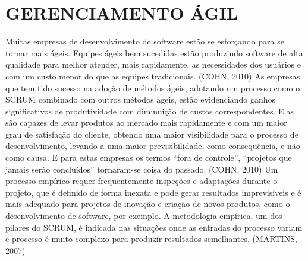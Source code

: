 \section{GERENCIAMENTO ÁGIL}
Muitas empresas de desenvolvimento de software estão se esforçando para se tornar mais ágeis. Equipes ágeis bem sucedidas estão produzindo software de alta qualidade para melhor atender, mais rapidamente, as necessidades dos usuários e com um custo menor do que as equipes tradicionais. (COHN, 2010)
As empresas que tem tido sucesso na adoção de métodos ágeis, adotando um processo como o SCRUM combinado com outros métodos ágeis, estão evidenciando ganhos significativos de produtividade com diminuição de custos correspondentes. Elas são capazes de levar produtos ao mercado mais rapidamente e com um maior grau de satisfação do cliente, obtendo uma maior visibilidade para o processo de desenvolvimento, levando a uma maior previsibilidade, como consequência, e não como causa. E para estas empresas os termos “fora de controle”, “projetos que jamais serão concluídos” tornaram-se coisa do passado. (COHN, 2010)
Um processo empírico requer frequentemente inspeções e adaptações durante o projeto, que é definido de forma inexata e pode gerar resultados imprevisíveis e é mais adequado para projetos de inovação e criação de novos produtos, como o desenvolvimento de software, por exemplo. A metodologia empírica, um dos pilares do SCRUM, é indicada nas situações onde as entradas do processo variam e processo é muito complexo para produzir resultados semelhantes. (MARTINS, 2007)

